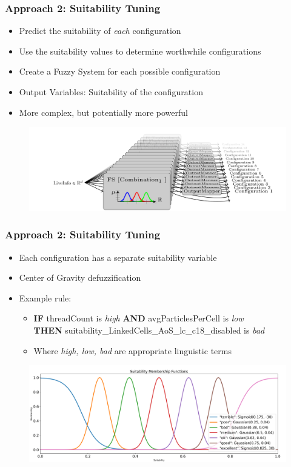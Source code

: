 \documentclass[
	10pt,
	t		%
]{beamer}
\begin{document}
\begin{frame}
	\frametitle{Approach 2: Suitability Tuning}
	\begin{itemize}
		\item Predict the suitability of \textit{each} configuration
		\item Use the suitability values to determine worthwhile configurations
		\item Create a Fuzzy System for each possible configuration
		\item Output Variables: Suitability of the configuration
		\item More complex, but potentially more powerful
	\end{itemize}

	\begin{figure}
		\centering
		\includegraphics[width=1\textwidth]{figures/suitability-approach.png}
	\end{figure}
\end{frame}


\begin{frame}
	\frametitle{Approach 2: Suitability Tuning}
	\begin{itemize}
		\item Each configuration has a separate suitability variable
		\item Center of Gravity defuzzification
		\item Example rule:
		      \begin{itemize}
			      \item
			            \textbf{IF} threadCount is \textit{high} \textbf{AND} avgParticlesPerCell is \textit{low}\\ \qquad \textbf{THEN} suitability\_LinkedCells\_AoS\_lc\_c18\_disabled is \textit{bad}
			      \item Where \textit{high, low, bad} are appropriate linguistic terms
		      \end{itemize}
	\end{itemize}

	\begin{figure}
		\centering
		\includegraphics[width=1\textwidth]{figures/suitability-linguistic-variable.png}
	\end{figure}

\end{frame}
\end{document}
